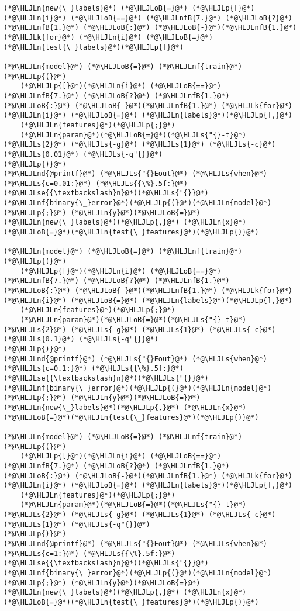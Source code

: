 \documentclass[12pt,a4paper]{article}
\newcommand{\HLJLk}[1]{\textcolor[RGB]{148,91,176}{\textbf{#1}}}
\newcommand{\HLJLn}[1]{#1}
\newcommand{\HLJLnd}[1]{\textcolor[RGB]{214,102,97}{#1}}
\newcommand{\HLJLnf}[1]{\textcolor[RGB]{66,102,213}{#1}}
\newcommand{\HLJLs}[1]{\textcolor[RGB]{201,61,57}{#1}}
\newcommand{\HLJLse}[1]{\textcolor[RGB]{59,151,46}{#1}}
\newcommand{\HLJLnfB}[1]{\textcolor[RGB]{59,151,46}{#1}}
\newcommand{\HLJLoB}[1]{\textcolor[RGB]{102,102,102}{\textbf{#1}}}
\newcommand{\HLJLp}[1]{#1}
\begin{document}
\begin{lstlisting}
(*@\HLJLn{new{\_}labels}@*) (*@\HLJLoB{=}@*) (*@\HLJLp{[}@*)(*@\HLJLn{i}@*) (*@\HLJLoB{==}@*) (*@\HLJLnfB{7.}@*) (*@\HLJLoB{?}@*) (*@\HLJLnfB{1.}@*) (*@\HLJLoB{:}@*) (*@\HLJLoB{-}@*)(*@\HLJLnfB{1.}@*) (*@\HLJLk{for}@*) (*@\HLJLn{i}@*) (*@\HLJLoB{=}@*) (*@\HLJLn{test{\_}labels}@*)(*@\HLJLp{]}@*)

(*@\HLJLn{model}@*) (*@\HLJLoB{=}@*) (*@\HLJLnf{train}@*)(*@\HLJLp{(}@*)
    (*@\HLJLp{[}@*)(*@\HLJLn{i}@*) (*@\HLJLoB{==}@*) (*@\HLJLnfB{7.}@*) (*@\HLJLoB{?}@*) (*@\HLJLnfB{1.}@*) (*@\HLJLoB{:}@*) (*@\HLJLoB{-}@*)(*@\HLJLnfB{1.}@*) (*@\HLJLk{for}@*) (*@\HLJLn{i}@*) (*@\HLJLoB{=}@*) (*@\HLJLn{labels}@*)(*@\HLJLp{],}@*) 
    (*@\HLJLn{features}@*)(*@\HLJLp{;}@*) 
    (*@\HLJLn{param}@*)(*@\HLJLoB{=}@*)(*@\HLJLs{"{}-t}@*) (*@\HLJLs{2}@*) (*@\HLJLs{-g}@*) (*@\HLJLs{1}@*) (*@\HLJLs{-c}@*) (*@\HLJLs{0.01}@*) (*@\HLJLs{-q"{}}@*)
(*@\HLJLp{)}@*)
(*@\HLJLnd{@printf}@*) (*@\HLJLs{"{}Eout}@*) (*@\HLJLs{when}@*) (*@\HLJLs{c=0.01:}@*) (*@\HLJLs{{\%}.5f:}@*)(*@\HLJLse{{\textbackslash}n}@*)(*@\HLJLs{"{}}@*) (*@\HLJLnf{binary{\_}error}@*)(*@\HLJLp{(}@*)(*@\HLJLn{model}@*)(*@\HLJLp{;}@*) (*@\HLJLn{y}@*)(*@\HLJLoB{=}@*)(*@\HLJLn{new{\_}labels}@*)(*@\HLJLp{,}@*) (*@\HLJLn{x}@*)(*@\HLJLoB{=}@*)(*@\HLJLn{test{\_}features}@*)(*@\HLJLp{)}@*)

(*@\HLJLn{model}@*) (*@\HLJLoB{=}@*) (*@\HLJLnf{train}@*)(*@\HLJLp{(}@*)
    (*@\HLJLp{[}@*)(*@\HLJLn{i}@*) (*@\HLJLoB{==}@*) (*@\HLJLnfB{7.}@*) (*@\HLJLoB{?}@*) (*@\HLJLnfB{1.}@*) (*@\HLJLoB{:}@*) (*@\HLJLoB{-}@*)(*@\HLJLnfB{1.}@*) (*@\HLJLk{for}@*) (*@\HLJLn{i}@*) (*@\HLJLoB{=}@*) (*@\HLJLn{labels}@*)(*@\HLJLp{],}@*) 
    (*@\HLJLn{features}@*)(*@\HLJLp{;}@*) 
    (*@\HLJLn{param}@*)(*@\HLJLoB{=}@*)(*@\HLJLs{"{}-t}@*) (*@\HLJLs{2}@*) (*@\HLJLs{-g}@*) (*@\HLJLs{1}@*) (*@\HLJLs{-c}@*) (*@\HLJLs{0.1}@*) (*@\HLJLs{-q"{}}@*)
(*@\HLJLp{)}@*)
(*@\HLJLnd{@printf}@*) (*@\HLJLs{"{}Eout}@*) (*@\HLJLs{when}@*) (*@\HLJLs{c=0.1:}@*) (*@\HLJLs{{\%}.5f:}@*)(*@\HLJLse{{\textbackslash}n}@*)(*@\HLJLs{"{}}@*) (*@\HLJLnf{binary{\_}error}@*)(*@\HLJLp{(}@*)(*@\HLJLn{model}@*)(*@\HLJLp{;}@*) (*@\HLJLn{y}@*)(*@\HLJLoB{=}@*)(*@\HLJLn{new{\_}labels}@*)(*@\HLJLp{,}@*) (*@\HLJLn{x}@*)(*@\HLJLoB{=}@*)(*@\HLJLn{test{\_}features}@*)(*@\HLJLp{)}@*)

(*@\HLJLn{model}@*) (*@\HLJLoB{=}@*) (*@\HLJLnf{train}@*)(*@\HLJLp{(}@*)
    (*@\HLJLp{[}@*)(*@\HLJLn{i}@*) (*@\HLJLoB{==}@*) (*@\HLJLnfB{7.}@*) (*@\HLJLoB{?}@*) (*@\HLJLnfB{1.}@*) (*@\HLJLoB{:}@*) (*@\HLJLoB{-}@*)(*@\HLJLnfB{1.}@*) (*@\HLJLk{for}@*) (*@\HLJLn{i}@*) (*@\HLJLoB{=}@*) (*@\HLJLn{labels}@*)(*@\HLJLp{],}@*) 
    (*@\HLJLn{features}@*)(*@\HLJLp{;}@*) 
    (*@\HLJLn{param}@*)(*@\HLJLoB{=}@*)(*@\HLJLs{"{}-t}@*) (*@\HLJLs{2}@*) (*@\HLJLs{-g}@*) (*@\HLJLs{1}@*) (*@\HLJLs{-c}@*) (*@\HLJLs{1}@*) (*@\HLJLs{-q"{}}@*)
(*@\HLJLp{)}@*)
(*@\HLJLnd{@printf}@*) (*@\HLJLs{"{}Eout}@*) (*@\HLJLs{when}@*) (*@\HLJLs{c=1:}@*) (*@\HLJLs{{\%}.5f:}@*)(*@\HLJLse{{\textbackslash}n}@*)(*@\HLJLs{"{}}@*) (*@\HLJLnf{binary{\_}error}@*)(*@\HLJLp{(}@*)(*@\HLJLn{model}@*)(*@\HLJLp{;}@*) (*@\HLJLn{y}@*)(*@\HLJLoB{=}@*)(*@\HLJLn{new{\_}labels}@*)(*@\HLJLp{,}@*) (*@\HLJLn{x}@*)(*@\HLJLoB{=}@*)(*@\HLJLn{test{\_}features}@*)(*@\HLJLp{)}@*)


\end{lstlisting}
\end{document}
